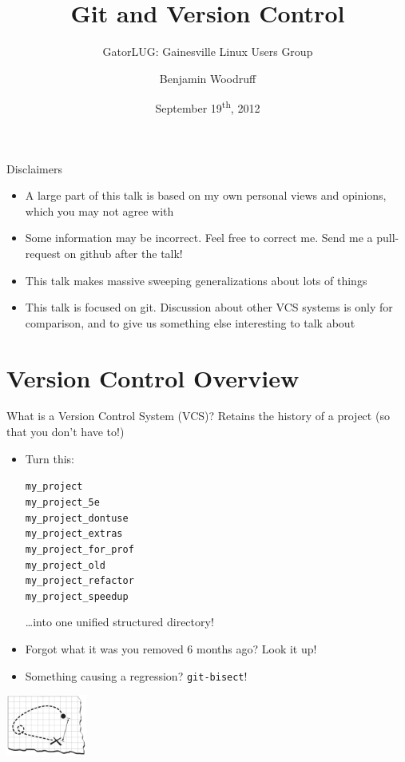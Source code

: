\documentclass[aspectratio=43]{beamer}
\title{Git and Version Control}
\subtitle[GatorLUG]{GatorLUG: Gainesville Linux Users Group}
\author{Benjamin Woodruff}
\institute{University of Florida}
\date{September 19\textsuperscript{th}, 2012}
\begin{document}
\frame{\maketitle}

\begin{frame}{Disclaimers}
    \begin{itemize}
    \item A large part of this talk is based on my own personal views and
        opinions, which you may not agree with
    \item Some information may be incorrect. Feel free to correct me. Send me a
        pull-request on github after the talk!
    \item This talk makes massive sweeping generalizations about lots of things
    \item This talk is focused on git. Discussion about other VCS systems is
        only for comparison, and to give us something else interesting to talk
        about
    \end{itemize}
\end{frame}

\section{Version Control Overview}

\begin{frame}{What is a Version Control System (VCS)?}
    Retains the history of a project (so that you don't have to!)
    \begin{itemize}
    \item Turn this:
        \begin{scriptsize}
        \begin{multicols}{3}
        \texttt{my\_project} \\
        \texttt{my\_project\_5e} \\
        \texttt{my\_project\_dontuse} \\
        \texttt{my\_project\_extras} \\
        \texttt{my\_project\_for\_prof} \\
        \texttt{my\_project\_old} \\
        \texttt{my\_project\_refactor} \\
        \texttt{my\_project\_speedup}
        \end{multicols}
        \end{scriptsize}
        \ldots into one unified structured directory!
    \item Forgot what it was you removed 6 months ago? Look it up!
    \item Something causing a regression? \texttt{git-bisect}!
    \end{itemize}
    \begin{flushright}
        \includegraphics[height=2cm]{resources/mapping_history.pdf}
    \end{flushright}
\end{frame}
\end{document}
